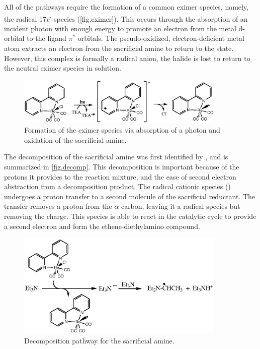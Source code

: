 All of the pathways require the formation of a common eximer species, namely, the radical 17\textit{e}\textsuperscript{-} species (\autoref{fig.eximer}). This occurs through the absorption of an incident photon with enough energy to promote an electron from the metal d-orbital to the ligand $\pi^\ast$ orbitals. The pseudo-oxidized, electron-deficient metal atom extracts an electron from the sacrificial amine to return to the  state. However, this complex is formally a radical anion, the halide is lost to return to the neutral eximer species in solution. 

\begin{figure}[!htb]
 \begin{center}
  \includegraphics[clip=true, width=100mm, keepaspectratio]{images/eximer.eps}
 \end{center}
\caption{Formation of the eximer species via absorption of a photon and oxidation of the sacrificial amine.}
\label{fig.eximer}
\end{figure} 

The decomposition of the sacrificial amine was first identified by , and is summarized in \autoref{fig.decomp}. This decomposition is important because of the protons it provides to the reaction mixture, and the ease of second electron abstraction from a decomposition product. The radical cationic species () undergoes a proton transfer to a second molecule of the sacrificial reductant. The transfer removes a proton from the $\alpha$ carbon, leaving it a radical species but removing the charge. This species is able to react in the catalytic cycle to provide a second electron and form the ethene-diethylamino compound.

\begin{figure}[!htb]
 \begin{center}
  \includegraphics[clip=true, width=100mm, keepaspectratio]{images/reddecomp.eps}
 \end{center}
\caption{Decomposition pathway for the sacrificial amine.}
\label{fig.decomp}
\end{figure} 

